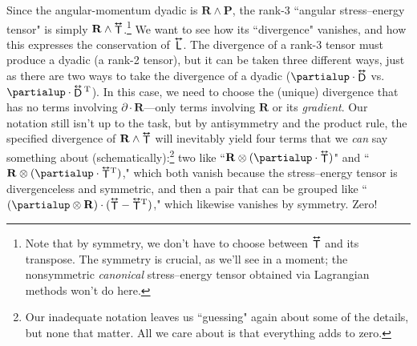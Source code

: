 \documentclass[12pt]{article}
\renewcommand{\vv}[1]{\mathbf{#1}}
\newcommand{\tightoverset}[2]{%
  \mathop{#2}\limits^{\vbox to -.5ex{\kern-0.75ex\hbox{$#1$}\vss}}}
\newcommand{\inlinedy}[1]{\tightoverset{\text{\tiny$\bm\leftrightarrow$}}{#1}}
\newcommand{\fnoverset}[2]{%
  \mathop{#2}\limits^{\vbox to -.5ex{\kern-0.85ex\hbox{$#1$}\vss}}}
\newcommand{\footnotedy}[1]{\fnoverset{\text{\tiny$\bm\leftrightarrow$}}{#1}}
\begin{document}
Since the angular-momentum dyadic is $\vv R \wedge \vv P$, the rank-3 ``angular stress--energy tensor" is simply $\vv R \wedge {\inlinedy{\mathsf{T}}} $.\footnote{Note that by symmetry, we don't have to choose between ${\footnotedy{\mathsf{T}}} $ and its transpose. The symmetry is crucial, as we'll see in a moment; the nonsymmetric \emph{canonical} stress--energy tensor obtained via Lagrangian methods won't do here.} We want to see how its ``divergence" vanishes, and how this expresses the conservation of $\inlinedy{\mathsf{L}}$. The divergence of a rank-3 tensor must produce a dyadic (a rank-2 tensor), but it can be taken three different ways, just as there are two ways to take the divergence of a dyadic (${\partialup \cdot \inlinedy{\mathsf{D}}}$ vs. $\partialup \cdot \inlinedy{\mathsf{D}} {}^{\mathrm{T}}$). In this case, we need to choose the (unique) divergence that has no terms involving $\partialup \cdot \vv R$---only terms involving $\vv R$ or its \emph{gradient}. Our notation still isn't up to the task, but by antisymmetry and the product rule, the specified divergence of $\vv R \wedge {\inlinedy{\mathsf{T}}} $ will inevitably yield four terms that we \emph{can} say something about (schematically):\footnote{Our inadequate notation leaves us ``guessing" again about some of the details, but none that matter. All we care about is that everything adds to zero.} two like ``$\vv R \otimes (\partialup \cdot {\inlinedy{\mathsf{T}}} )$" and ``$\vv R \otimes (\partialup \cdot {\inlinedy{\mathsf{T}}} {}^{\mathrm{T}} )$," which both vanish because the stress--energy tensor is divergenceless and symmetric, and then a pair that can be grouped like ``$(\partialup \otimes \vv R) \cdot ({\inlinedy{\mathsf{T}}} - {\inlinedy{\mathsf{T}}} {}^{\mathrm{T}} )$," which likewise vanishes by symmetry. Zero!
\end{document}

